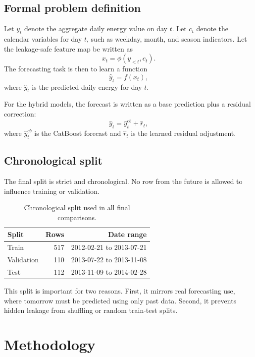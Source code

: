 \documentclass[conference]{IEEEtran}
\begin{document}
\subsection{Formal problem definition}
Let $y_t$ denote the aggregate daily energy value on day $t$. Let $c_t$ denote the calendar variables for day $t$, such as weekday, month, and season indicators. Let the leakage-safe feature map be written as
\begin{equation}
x_t = \phi(y_{<t}, c_t).
\end{equation}
The forecasting task is then to learn a function
\begin{equation}
\hat{y}_t = f(x_t),
\end{equation}
where $\hat{y}_t$ is the predicted daily energy for day $t$.

For the hybrid models, the forecast is written as a base prediction plus a residual correction:
\begin{equation}
\hat{y}_t = \hat{y}^{cb}_t + \hat{r}_t,
\end{equation}
where $\hat{y}^{cb}_t$ is the CatBoost forecast and $\hat{r}_t$ is the learned residual adjustment.

\subsection{Chronological split}
The final split is strict and chronological. No row from the future is allowed to influence training or validation.

\begin{table}[t]
\caption{Chronological split used in all final comparisons.}
\label{tab:split_summary}
\centering
\begin{tabular}{lrr}
\toprule
\textbf{Split} & \textbf{Rows} & \textbf{Date range} \\
\midrule
Train & 517 & 2012-02-21 to 2013-07-21 \\
Validation & 110 & 2013-07-22 to 2013-11-08 \\
Test & 112 & 2013-11-09 to 2014-02-28 \\
\bottomrule
\end{tabular}
\end{table}

This split is important for two reasons. First, it mirrors real forecasting use, where tomorrow must be predicted using only past data. Second, it prevents hidden leakage from shuffling or random train-test splits.

\section{Methodology}
\end{document}
